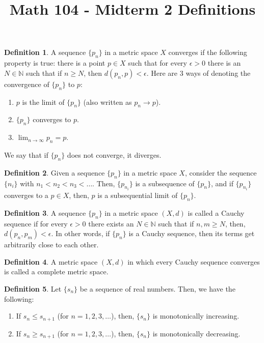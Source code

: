 \documentclass[12pt]{article}
\theoremstyle{definition}
\newtheorem{definition}{Definition}
\theoremstyle{named}
\begin{document}
\title{Math 104 - Midterm 2 Definitions}
\author{}
\date{}
\maketitle
\date

\renewcommand{\thedefinition}{3.1}
\begin{definition}
    A sequence $\{p_n\}$ in a metric space $X$ converges if the following property is true: there is a point $p \in X$ such that for every $\epsilon > 0$ there is an $N \in \mathbb{N}$ such that if $n \geq N$, then $d\left(p_n,p\right) < \epsilon$. Here are 3 ways of denoting the convergence of $\{p_n\}$ to $p$: 
    \begin{enumerate}
        \item $p$ is the limit of $\{p_n\}$ (also written as $p_n \to p$). 
        \item $\{p_n\}$ converges to $p$. 
        \item $\lim_{n \to \infty} p_n = p$. 
    \end{enumerate}
    We say that if $\{p_n\}$ does not converge, it diverges. 
\end{definition}

\renewcommand{\thedefinition}{3.5}
\begin{definition}
    Given a sequence $\{p_n\}$ in a metric space $X$, consider the sequence $\{n_i\}$ with $n_1 < n_2 < n_3 < \dots$. Then, $\{p_{n_i}\}$ is a subsequence of $\{p_n\}$, and if $\{p_{n_i}\}$ converges to a $p \in X$, then, $p$ is a subsequential limit of $\{p_n\}$. 
\end{definition}

\renewcommand{\thedefinition}{3.8}
\begin{definition}
    A sequence $\{p_n\}$ in a metric space $(X,d)$ is called a Cauchy sequence if for every $\epsilon > 0$ there exists an $N \in \mathbb{N}$ such that if $n, m \geq N$, then, $d\left(p_n, p_m\right) < \epsilon$. In other words, if $\{p_n\}$ is a Cauchy sequence, then its terms get arbitrarily close to each other. 
\end{definition}

\renewcommand{\thedefinition}{3.12}
\begin{definition}
    A metric space $(X,d)$ in which every Cauchy sequence converges is called a complete metric space. 
\end{definition}

\renewcommand{\thedefinition}{3.13}
\begin{definition}
    Let $\{s_n\}$ be a sequence of real numbers. Then, we have the following: 
    \begin{enumerate}
        \item If $s_n \leq s_{n+1}$ (for $n=1,2,3,\dots$), then, $\{s_n\}$ is monotonically increasing. 
        \item If $s_n \geq s_{n+1}$ (for $n=1,2,3,\dots$), then, $\{s_n\}$ is monotonically decreasing. 
    \end{enumerate}
\end{definition}
\end{document}

